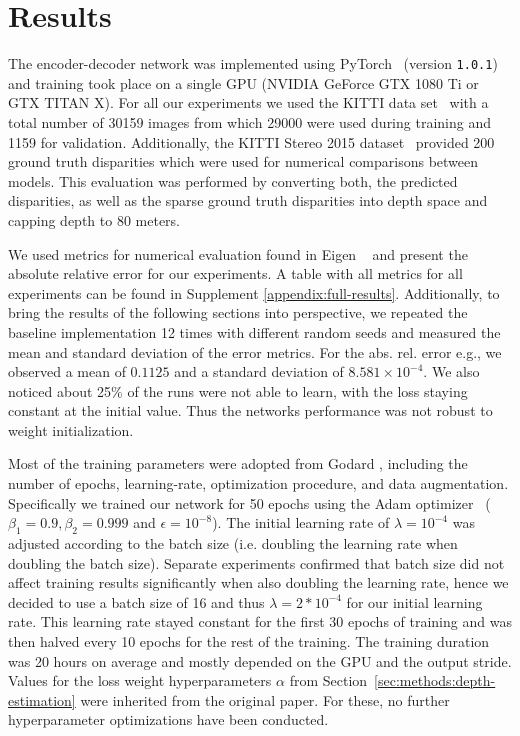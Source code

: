 \section{Results}
\label{section:experiments}

The encoder-decoder network was implemented using PyTorch~\cite{paszke2017automatic} (version \texttt{1.0.1}) and training took place on a single GPU (NVIDIA GeForce GTX 1080 Ti or GTX TITAN X).
For all our experiments we used the KITTI data set~\cite{Geiger2013IJRR} with a total number of 30159 images from which 29000 were used during training and 1159 for validation. Additionally, the KITTI Stereo 2015 dataset~\cite{Menze2015CVPR} provided 200 ground truth disparities which were used for numerical comparisons between models. This evaluation was performed by converting both, the predicted disparities, as well as the sparse ground truth disparities into depth space and capping depth to 80 meters.

We used metrics for numerical evaluation found in Eigen \etal~\cite{eigen2014depth} and present the absolute relative error for our experiments. A table with all metrics for all experiments can be found in Supplement \ref{appendix:full-results}. Additionally, to bring the results of the following sections into perspective, we repeated the baseline implementation 12 times with different random seeds and measured the mean and standard deviation of the error metrics. For the abs. rel. error e.g., we observed a mean of $0.1125$ and a standard deviation of $8.581 \times 10^{-4}$. We also noticed about 25\% of the runs were not able to learn, with the loss staying constant at the initial value. Thus the networks performance was not robust to weight initialization.

Most of the training parameters were adopted from Godard \etal, including the number of epochs, learning-rate, optimization procedure, and data augmentation.
Specifically we trained our network for 50 epochs using the Adam optimizer~\cite{kingma2014adam} ($\beta_1 = 0.9, \beta_2 = 0.999$ and $\epsilon = 10^{-8} $). The initial learning rate of $\lambda = 10^{-4}$ was adjusted according to the batch size (i.e. doubling the learning rate when doubling the batch size).
Separate experiments confirmed that batch size did not affect training results significantly when also doubling the learning rate, hence we decided to use a batch size of 16 and thus $\lambda = 2*10^{-4}$ for our initial learning rate. This learning rate stayed constant for the first 30 epochs of training and was then halved every 10 epochs for the rest of the training. The training duration was 20 hours on average and mostly depended on the GPU and the output stride.
Values for the loss weight hyperparameters $\alpha$ from Section~\ref{sec:methods:depth-estimation} were inherited from the original paper. For these, no further hyperparameter optimizations have been conducted.

